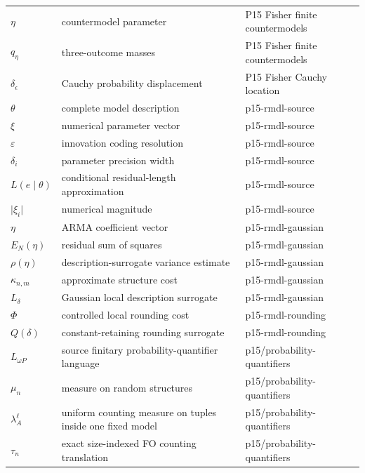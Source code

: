 \begin{longtable}{@{}p{}p{}p{}@{}}
\(\eta\) & countermodel parameter & P15 Fisher finite countermodels \\
\(q_\eta\) & three-outcome masses & P15 Fisher finite countermodels \\
\(\delta_\epsilon\) & Cauchy probability displacement & P15 Fisher Cauchy location \\
\(\theta\) & complete model description & p15-\allowbreak{}rmdl-\allowbreak{}source \\
\(\xi\) & numerical parameter vector & p15-\allowbreak{}rmdl-\allowbreak{}source \\
\(\varepsilon\) & innovation coding resolution & p15-\allowbreak{}rmdl-\allowbreak{}source \\
\(\delta_i\) & parameter precision width & p15-\allowbreak{}rmdl-\allowbreak{}source \\
\(L(e\mid\theta)\) & conditional residual-length approximation & p15-\allowbreak{}rmdl-\allowbreak{}source \\
\(\lvert\xi_i\rvert\) & numerical magnitude & p15-\allowbreak{}rmdl-\allowbreak{}source \\
\(\eta\) & ARMA coefficient vector & p15-\allowbreak{}rmdl-\allowbreak{}gaussian \\
\(E_N(\eta)\) & residual sum of squares & p15-\allowbreak{}rmdl-\allowbreak{}gaussian \\
\(\rho(\eta)\) & description-surrogate variance estimate & p15-\allowbreak{}rmdl-\allowbreak{}gaussian \\
\(\kappa_{n,m}\) & approximate structure cost & p15-\allowbreak{}rmdl-\allowbreak{}gaussian \\
\(L_\delta\) & Gaussian local description surrogate & p15-\allowbreak{}rmdl-\allowbreak{}gaussian \\
\(\Phi\) & controlled local rounding cost & p15-\allowbreak{}rmdl-\allowbreak{}rounding \\
\(Q(\delta)\) & constant-retaining rounding surrogate & p15-\allowbreak{}rmdl-\allowbreak{}rounding \\
\(L_{\omega P}\) & source finitary probability-quantifier language & p15/\allowbreak{}probability-\allowbreak{}quantifiers \\
\(\mu_n\) & measure on random structures & p15/\allowbreak{}probability-\allowbreak{}quantifiers \\
\(\lambda_A^\ell\) & uniform counting measure on tuples inside one fixed model & p15/\allowbreak{}probability-\allowbreak{}quantifiers \\
\(\tau_n\) & exact size-indexed FO counting translation & p15/\allowbreak{}probability-\allowbreak{}quantifiers \\

\end{longtable}
